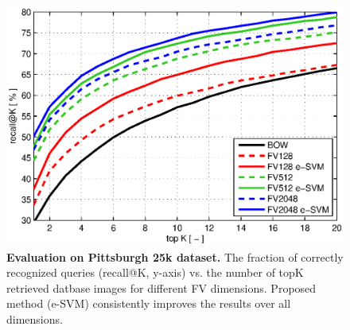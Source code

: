 \documentclass[table]{article} %
\begin{document}
\begin{figure}[t!]
    \centering
    \includegraphics[width=\linewidth]{imgs/plotPitt25k}    
    \caption{
        \textbf{Evaluation on Pittsburgh 25k \cite{Gronat13} dataset.} The fraction of correctly recognized queries (recall@K, y-axis) vs. the number of topK retrieved datbase images for different FV dimensions. Proposed method (e-SVM) consistently improves the results over all dimensions.
    }
    \label{fig:recall}
\end{figure}

\end{document}
